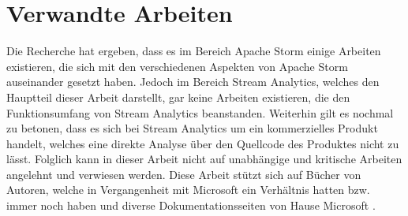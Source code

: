 \section{Verwandte Arbeiten}
Die Recherche hat ergeben, dass es im Bereich Apache Storm einige Arbeiten existieren, die sich mit den verschiedenen Aspekten von Apache Storm auseinander gesetzt haben. Jedoch im Bereich Stream Analytics, welches den Hauptteil dieser Arbeit darstellt, gar keine Arbeiten existieren, die den Funktionsumfang von Stream Analytics beanstanden. Weiterhin gilt es nochmal zu betonen, dass es sich bei Stream Analytics um ein kommerzielles Produkt handelt, welches eine direkte Analyse über den Quellcode des Produktes nicht zu lässt. Folglich kann in dieser Arbeit nicht auf unabhängige und kritische Arbeiten angelehnt und verwiesen werden. Diese Arbeit stützt sich auf Bücher von Autoren, welche in Vergangenheit mit Microsoft ein Verhältnis hatten bzw. immer noch haben und diverse Dokumentationsseiten von Hause Microsoft \cite{Familiar.2017} \cite{Klein.2017}. 